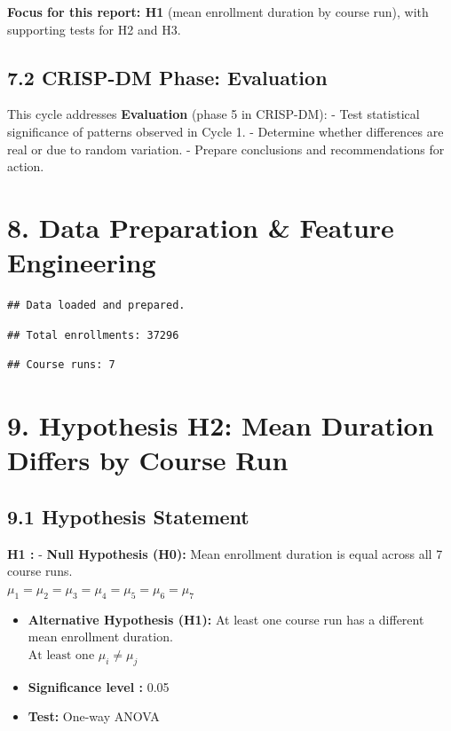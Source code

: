 \documentclass[
]{article}
\begin{document}
\textbf{Focus for this report: H1} (mean enrollment duration by course
run), with supporting tests for H2 and H3.

\subsection{7.2 CRISP-DM Phase:
Evaluation}\label{crisp-dm-phase-evaluation}

This cycle addresses \textbf{Evaluation} (phase 5 in CRISP-DM): - Test
statistical significance of patterns observed in Cycle 1. - Determine
whether differences are real or due to random variation. - Prepare
conclusions and recommendations for action.

\section{8. Data Preparation \& Feature
Engineering}\label{data-preparation-feature-engineering}

\begin{verbatim}
## Data loaded and prepared.
\end{verbatim}

\begin{verbatim}
## Total enrollments: 37296
\end{verbatim}

\begin{verbatim}
## Course runs: 7
\end{verbatim}

\section{9. Hypothesis H2: Mean Duration Differs by Course
Run}\label{hypothesis-h2-mean-duration-differs-by-course-run}

\subsection{9.1 Hypothesis Statement}\label{hypothesis-statement}

\textbf{H1 :} - \textbf{Null Hypothesis (H0):} Mean enrollment duration
is equal across all 7 course runs.\\
\(μ_1 = μ_2 = μ_3 = μ_4 = μ_5 = μ_6 = μ_7\)

\begin{itemize}
\item
  \textbf{Alternative Hypothesis (H1):} At least one course run has a
  different mean enrollment duration.\\
  \(\text{At least one } μ_i \neq μ_j\)
\item
  \textbf{Significance level :} 0.05\\
\item
  \textbf{Test:} One-way ANOVA
\end{itemize}
\end{document}
